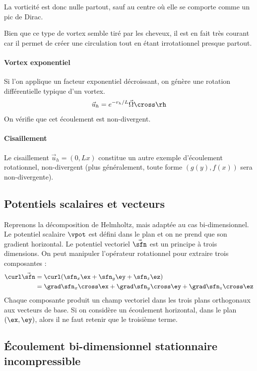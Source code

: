 La vorticité est donc nulle partout, sauf au centre où elle se comporte comme un pic de Dirac.

Bien que ce type de vortex semble tiré par les cheveux, il est en fait très courant car il permet de créer une circulation tout en étant irrotationnel presque partout.

\paragraph{Vortex exponentiel}
Si l'on applique un facteur exponentiel décroissant, on génère une rotation différentielle typique d'un vortex.
\begin{displaymath}
  \vec{u}_h = e^{-r_h/L} \vec{\Omega}\cross\rh
\end{displaymath}
On vérifie que cet écoulement est non-divergent.

\paragraph{Cisaillement}
Le cisaillement $\vec{u}_h = (0,Lx)$ constitue un autre exemple d'écoulement rotationnel, non-divergent (plus généralement, toute forme $(g(y), f(x))$ sera non-divergente).

\subsection{Potentiels scalaires et vecteurs}
Reprenons la décomposition de Helmholtz, mais adaptée au cas bi-dimensionnel. Le potentiel scalaire $\vpot$ est défini dans le plan et on ne prend que son gradient horizontal. Le potentiel vectoriel $\vec{\sfn}$ est un principe à trois dimensions. On peut manipuler l'opérateur rotationnel pour extraire trois composantes :
\begin{equation}
  \begin{split}
     \curl \vec{\sfn} %
                     &= \curl ( \sfn_x \ex  + \sfn_y \ey + \sfn_z \ez ) \\
                     &= \grad \sfn_x \cross \ex +  \grad \sfn_y \cross \ey +  \grad \sfn_z \cross \ez
   \end{split}
\end{equation}
Chaque composante produit un champ vectoriel dans les trois plans orthogonaux aux vecteurs de base. Si on considère un écoulement horizontal, dans le plan $(\ex, \ey)$, alors il ne faut retenir que le troisième terme.

\subsection{Écoulement bi-dimensionnel stationnaire incompressible}
